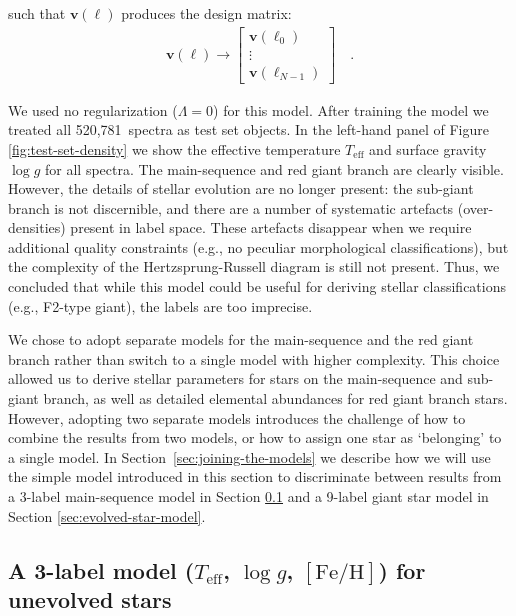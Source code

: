 \documentclass[preprint]{aastex}
\newcommand{\teff}{T_{\mathrm{eff}}}
\newcommand{\logg}{\log g}
\newcommand{\feh}{[\mathrm{Fe/H}]}
\newcommand{\Nspectra}{520,781}
\newcommand{\Dvector}[1]{\boldsymbol{#1}}
\newcommand{\vecv}{\Dvector{v}}
\begin{document}
\noindent{}such that $\vecv(\ell)$ produces the design matrix:
\begin{eqnarray}
	\vecv(\ell) \rightarrow \begin{bmatrix} \vecv(\ell_0) \\ \vdots \\ \vecv(\ell_{N-1}) \end{bmatrix} \quad .
\end{eqnarray}


We used no regularization ($\Lambda = 0$) for this model.  After training the model we
treated all \Nspectra\ spectra as test set objects.  In the left-hand panel of Figure 
\ref{fig:test-set-density} we show the effective temperature $\teff$ and surface gravity 
$\logg$ for all spectra.  The main-sequence and red giant branch are clearly visible.  
However, the details of stellar evolution are no longer present: the sub-giant branch is 
not discernible, and there are a number of systematic artefacts (over-densities) present
in label space.  These artefacts disappear when we require additional quality constraints 
(e.g., no peculiar morphological classifications), but the complexity of the 
Hertzsprung-Russell diagram is still not present.  Thus, we concluded that while this 
model could be useful for deriving stellar classifications (e.g., F2-type giant), the 
labels are too imprecise.


We chose to adopt separate models for the main-sequence and the red giant branch rather
than switch to a single model with higher complexity.  This choice allowed us to derive
stellar parameters for stars on the main-sequence and sub-giant branch, as well as 
detailed elemental abundances for red giant branch stars.  However, adopting two separate
models introduces the challenge of how to combine the results from two models, or how to
assign one star as `belonging' to a single model.  In Section~\ref{sec:joining-the-models}
we describe how we will use the simple model introduced in this section to discriminate
between results from a 3-label main-sequence model in Section \ref{sec:unevolved-star-model} 
and a 9-label giant star model in Section \ref{sec:evolved-star-model}.


\subsection{A 3-label model ($\teff$, $\logg$, $\feh$) for unevolved stars}
\label{sec:unevolved-star-model}
\end{document}

